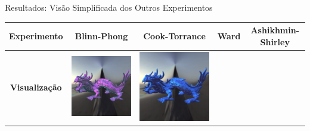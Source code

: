 \begin{frame}[fragile]{Resultados: Visão Simplificada dos Outros Experimentos}
   \begin{table}
       \centering
       \scriptsize %
       \begin{tabular}{|c|c|c|c|c|}
           \hline
           \textbf{Experimento}        & Blinn-Phong     & Cook-Torrance   & Ward           & Ashikhmin-Shirley \\ \hline
           \textbf{Visualização} &
           \includegraphics[scale=0.14]{./Imagens/brdfs/blinn-phong-dragon.png} & 
           \includegraphics[scale=0.14]{./Imagens/brdfs/cook-torrance-dragon.png} & 

\end{tabular}
\end{table}
\end{frame}
